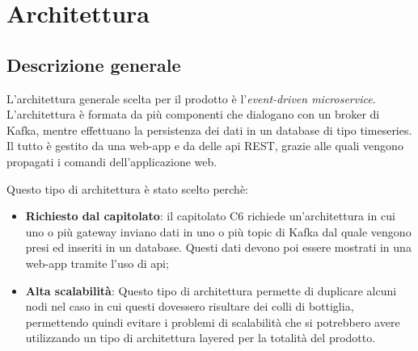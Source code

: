 \section{Architettura} 
	\subsection{Descrizione generale}
		L'architettura generale scelta per il prodotto è l'\textit{event-driven microservice}. 
		L'architettura è formata da più componenti che dialogano con un broker di Kafka, mentre effettuano la persistenza dei dati in un database di tipo timeseries. Il tutto è gestito da una web-app e da delle api REST, grazie alle quali vengono propagati i comandi dell'applicazione web.

		Questo tipo di architettura è stato scelto perchè:
		\begin{itemize}
		 	\item \textbf{Richiesto dal capitolato}: il capitolato C6 richiede un'architettura in cui uno o più gateway inviano dati in uno o più topic di Kafka dal quale vengono presi ed inseriti in un database. Questi dati devono poi essere mostrati in una web-app tramite l'uso di api;
		 	\item \textbf{Alta scalabilità}: Questo tipo di architettura permette di duplicare alcuni nodi nel caso in cui questi dovessero risultare dei colli di bottiglia, permettendo quindi evitare i problemi di scalabilità che si potrebbero avere utilizzando un tipo di architettura layered per la totalità del prodotto.
		\end{itemize}

